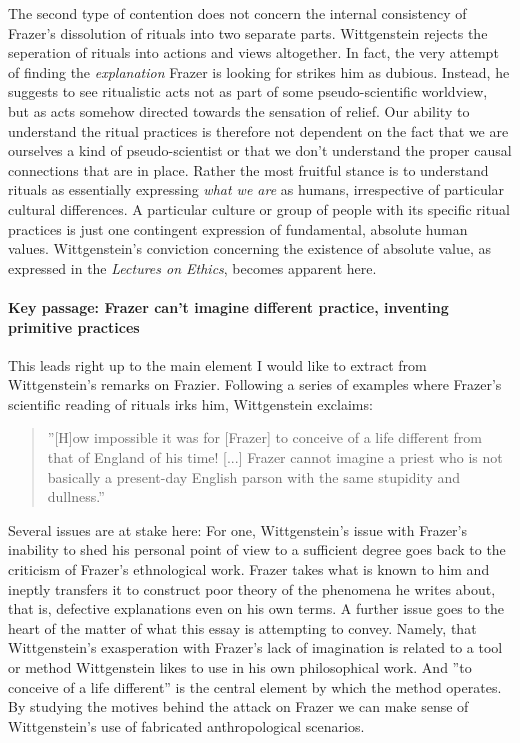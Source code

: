 \documentclass{article}
\begin{document}
The second type of contention does not concern the internal consistency of Frazer's dissolution of rituals into two separate parts. Wittgenstein rejects the seperation of rituals into actions and views altogether.
In fact, the very attempt of finding the \textit{explanation} Frazer is looking for strikes him as dubious.
Instead, he suggests to see ritualistic acts not as part of some pseudo-scientific worldview, but as acts somehow directed towards the sensation of relief. Our ability to understand the ritual practices is therefore not dependent on the fact that we are ourselves a kind of pseudo-scientist or that we don't understand the proper causal connections that are in place. Rather the most fruitful stance is to understand rituals as essentially expressing \textit{what we are} as humans, irrespective of particular cultural differences. A particular culture or group of people with its specific ritual practices is just one contingent expression of fundamental, absolute human values. Wittgenstein's conviction concerning the existence of absolute value, as expressed in the \textit{Lectures on Ethics}, becomes apparent here.

\paragraph{Key passage: Frazer can't imagine different practice, inventing primitive practices}
This leads right up to the main element I would like to extract from Wittgenstein's remarks on Frazier. Following a series of examples where Frazer's scientific reading of rituals irks him, Wittgenstein exclaims:
\begin{quote}
''[H]ow impossible it was for [Frazer] to conceive of a life different from that of England of his time! [...] Frazer cannot imagine a priest who is not basically a present-day English parson with the same stupidity and dullness.''
\end{quote} %
Several issues are at stake here: For one, Wittgenstein's issue with Frazer's inability to shed his personal point of view to a sufficient degree goes back to the criticism of Frazer's ethnological work. Frazer takes what is known to him and ineptly transfers it to construct poor theory of the phenomena he writes about, that is, defective explanations even on his own terms. A further issue goes to the heart of the matter of what this essay is attempting to convey. Namely, that Wittgenstein's exasperation with Frazer's lack of imagination is related to a tool or method Wittgenstein likes to use in his own philosophical work. And ''to conceive of a life different'' is the central element by which the method operates. By studying the motives behind the attack on Frazer we can make sense of Wittgenstein's use of fabricated anthropological scenarios. 
 
\end{document}
